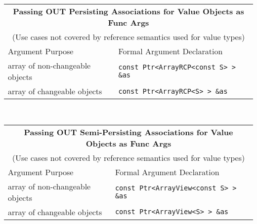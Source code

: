 %
\begin{tabular}{|l|l|}
%
\multicolumn{2}{c}{\textbf{Passing OUT Persisting Associations for Value Objects as Func Args}} \\
\multicolumn{2}{c}{(Use cases not covered by reference semantics used for value types)} \\
%
\hline
Argument Purpose
& Formal Argument Declaration \\
\hline
\hline
array of non-changeable objects
& {}\texttt{const Ptr<ArrayRCP<const S> > \&as} \\
\hline
array of changeable objects
& {}\texttt{const Ptr<ArrayRCP<S> > \&as} \\
\hline
\end{tabular} \\[3ex]
%
\begin{tabular}{|l|l|}
%
\multicolumn{2}{c}{\textbf{Passing OUT Semi-Persisting Associations for Value Objects as Func Args}} \\
\multicolumn{2}{c}{(Use cases not covered by reference semantics used for value types)} \\
%
\hline
Argument Purpose
& Formal Argument Declaration \\
\hline
array of non-changeable objects
& {}\texttt{const Ptr<ArrayView<const S> > \&as} \\
\hline
array of changeable objects
& {}\texttt{const Ptr<ArrayView<S> > \&as} \\
\hline
\end{tabular}
